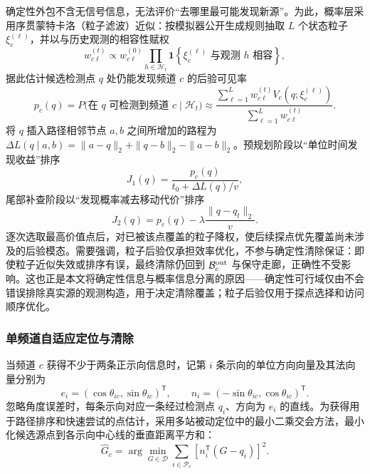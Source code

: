 \documentclass[zihao=-4,a4paper,UTF8,fontset=none]{ctexart}
\begin{document}
确定性外包不含无信号信息，无法评价“去哪里最可能发现新源”。为此，概率层采用序贯蒙特卡洛（粒子滤波）近似\cite{arulampalam2002,thrun2005}：按模拟器公开生成规则抽取 $L$ 个状态粒子 $\xi_c^{(\ell)}$，并以与历史观测的相容性赋权
\begin{equation}
w_{c\ell}^{(t)}\propto w_{c\ell}^{(0)}
\prod_{h\in\mathcal H_t}
\mathbf 1\!\left\{\xi_c^{(\ell)}\text{ 与观测 }h\text{ 相容}\right\},
\label{eq:q4_particle_weight}
\end{equation}
据此估计候选检测点 $q$ 处仍能发现频道 $c$ 的后验可见率
\begin{equation}
p_c(q)=P\bigl(\text{在 }q\text{ 可检测到频道 }c\mid\mathcal H_t\bigr)
\approx\frac{\sum_{\ell=1}^{L}w_{c\ell}^{(t)}V_c(q;\xi_c^{(\ell)})}{\sum_{\ell=1}^{L}w_{c\ell}^{(t)}}.
\label{eq:q4_probe_probability}
\end{equation}
将 $q$ 插入路径相邻节点 $a,b$ 之间所增加的路程为 $\Delta L(q\mid a,b)=\|a-q\|_2+\|q-b\|_2-\|a-b\|_2$。预规划阶段以“单位时间发现收益”排序
\begin{equation}
J_1(q)=\frac{p_c(q)}{t_0+\Delta L(q)/v},
\label{eq:q4_probe_score1}
\end{equation}
尾部补查阶段以“发现概率减去移动代价”排序
\begin{equation}
J_2(q)=p_c(q)-\lambda\frac{\|q-q_t\|_2}{v}.
\label{eq:q4_probe_score2}
\end{equation}
逐次选取最高价值点后，对已被该点覆盖的粒子降权，使后续探点优先覆盖尚未涉及的后验模态。需要强调，粒子后验仅承担效率优化，不参与确定性清除保证：即使粒子近似失效或排序有误，最终清除仍回到 $\mathcal B_c^{\rm out}$ 与保守走廊，正确性不受影响。这也正是本文将确定性信息与概率信息分离的原因——确定性可行域仅由不会错误排除真实源的观测构造，用于决定清除覆盖；粒子后验仅用于探点选择和访问顺序优化。

\subsubsection{单频道自适应定位与清除}

当频道 $c$ 获得不少于两条正示向信息时，记第 $i$ 条示向的单位方向向量及其法向量分别为
\[
e_i=(\cos\theta_{ic},\sin\theta_{ic})^{\mathsf T},\qquad
n_i=(-\sin\theta_{ic},\cos\theta_{ic})^{\mathsf T}.
\]
忽略角度误差时，每条示向对应一条经过检测点 $q_i$、方向为 $e_i$ 的直线。为获得用于路径排序和快速尝试的点估计，采用多站被动定位中的最小二乘交会方法\cite{torrieri1984}，最小化候选源点到各示向中心线的垂直距离平方和：
\begin{equation}
\widehat G_c
=\arg\min_{G\in\mathcal D}
\sum_{i\in\mathcal P_c}
\left[n_i^{\mathsf T}(G-q_i)\right]^2.
\label{eq:q4_ls}
\end{equation}
\end{document}

